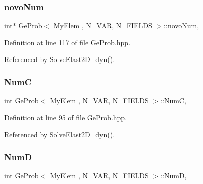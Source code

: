 \mbox{\label{classGeProb_ab8ee4f31d624e14988e65a7cd5c6a457}} 
\subsubsection{\texorpdfstring{novo\+Num}{novoNum}}
{\footnotesize\ttfamily int$\ast$ \hyperlink{classGeProb}{Ge\+Prob}$<$ \hyperlink{DG__Prob_8h_a83cd887ced9a6587428f267e50cd4787}{My\+Elem} , \hyperlink{classED__Prob_a4e7d2ff1a8e435e336fb00c527224b5a}{N\+\_\+\+V\+AR}, N\+\_\+\+F\+I\+E\+L\+DS $>$\+::novo\+Num\hspace{0.3cm}{\ttfamily [protected]}, {\ttfamily [inherited]}}



Definition at line 117 of file Ge\+Prob.\+hpp.



Referenced by Solve\+Elast2\+D\+\_\+dyn().

\mbox{\label{classGeProb_a579ca91b970ea46b1418310eaf5d8b31}} 
\subsubsection{\texorpdfstring{NumC}{NumC}}
{\footnotesize\ttfamily int \hyperlink{classGeProb}{Ge\+Prob}$<$ \hyperlink{DG__Prob_8h_a83cd887ced9a6587428f267e50cd4787}{My\+Elem} , \hyperlink{classED__Prob_a4e7d2ff1a8e435e336fb00c527224b5a}{N\+\_\+\+V\+AR}, N\+\_\+\+F\+I\+E\+L\+DS $>$\+::NumC\hspace{0.3cm}{\ttfamily [protected]}, {\ttfamily [inherited]}}



Definition at line 95 of file Ge\+Prob.\+hpp.



Referenced by Solve\+Elast2\+D\+\_\+dyn().

\mbox{\label{classGeProb_a1b63e3bc1b1f5e6582a87b044bbd4ccd}} 
\subsubsection{\texorpdfstring{NumD}{NumD}}
{\footnotesize\ttfamily int \hyperlink{classGeProb}{Ge\+Prob}$<$ \hyperlink{DG__Prob_8h_a83cd887ced9a6587428f267e50cd4787}{My\+Elem} , \hyperlink{classED__Prob_a4e7d2ff1a8e435e336fb00c527224b5a}{N\+\_\+\+V\+AR}, N\+\_\+\+F\+I\+E\+L\+DS $>$\+::NumD\hspace{0.3cm}{\ttfamily [protected]}, {\ttfamily [inherited]}}



